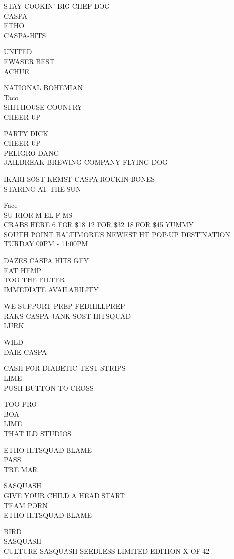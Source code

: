 \documentclass[10pt,letterpaper]{article}
\begin{document}
STAY COOKIN' BIG CHEF DOG\\
CASPA\\
ETHO\\
CASPA{-}HITS

UNITED\\
EWASER BEST\\
ACHUE

NATIONAL BOHEMIAN\\
Taco\\
SHITHOUSE COUNTRY\\
CHEER UP

PARTY DICK\\
CHEER UP\\
PELIGRO DANG\\
JAILBREAK BREWING COMPANY FLYING DOG

IKARI SOST KEMST CASPA ROCKIN BONES\\
STARING AT THE SUN

Face\\
SU RIOR M EL F MS\\
CRABS HERE 6 FOR \$18 12 FOR \$32 18 FOR \$45 YUMMY\\
SOUTH POINT BALTIMORE'S NEWEST HT POP{-}UP DESTINATION TURDAY 00PM {-} 11:00PM

DAZES CASPA HITS GFY\\
EAT HEMP\\
TOO THE FILTER\\
IMMEDIATE AVAILABILITY

WE SUPPORT PREP FEDHILLPREP\\
RAKS CASPA JANK SOST HITSQUAD\\
LURK

WILD\\
DAIE CASPA

CASH FOR DIABETIC TEST STRIPS\\
LIME\\
PUSH BUTTON TO CROSS

TOO PRO\\
BOA\\
LIME\\
THAT ILD STUDIOS

ETHO HITSQUAD BLAME\\
PASS\\
TRE MAR

SASQUASH\\
GIVE YOUR CHILD A HEAD START\\
TEAM PORN\\
ETHO HITSQUAD BLAME

BIRD\\
SASQUASH\\
CULTURE SASQUASH SEEDLESS LIMITED EDITION X OF 42
\end{document}
